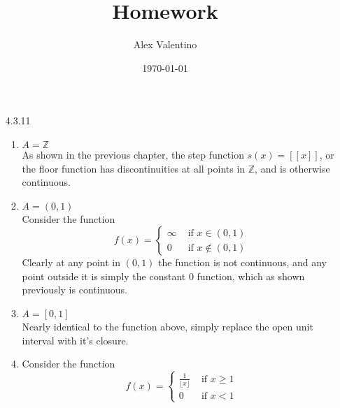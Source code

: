 \documentclass[12pt, letterpaper]{article}
\date{\today}
\author{Alex Valentino}
\title{Homework }
\newcommand{\Z}{\mathbb{Z}}
\begin{document}
\begin{enumerate}
	\item[4.3.11]
	\begin{enumerate}
		\item $A = \Z$\\
		As shown in the previous chapter, the step function $s(x) = [[x]]$, or the floor function has discontinuities at all points in $\Z$, and is otherwise continuous.  
		\item $A = (0,1)$\\
		Consider the function \[ f(x)= \begin{cases}  \infty  & \text{ if } x \in (0,1) \\ 0 & \text{ if } x \not \in (0,1)
		\end{cases}\]
		Clearly at any point in $(0,1)$ the function is not continuous, and any point outside it is simply the constant 0 function, which as shown previously is continuous.
		\item $A = [0,1]$\\
		Nearly identical to the function above, simply replace the open unit interval with it's closure.  
		\item Consider the function \[ f(x)= \begin{cases}  \frac{1}{\lfloor x \rfloor}  & \text{ if } x\geq 1 \\ 0 & \text{ if } x < 1
		\end{cases}\]
	\end{enumerate}
\end{enumerate}
\end{document}
